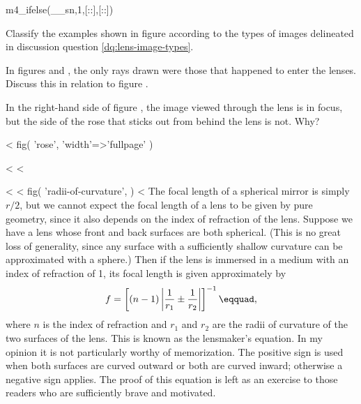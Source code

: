 m4_ifelse(__sn,1,[:\pagebreak:],[::])

\begin{dq}
Classify the examples shown in figure  according to
the types of images delineated in discussion question \ref{dq:lens-image-types}.
\end{dq}

\begin{dq}
In figures  and , the only rays drawn were those
that happened to enter the lenses. Discuss this in
relation to figure .
\end{dq}

\begin{dq}\label{dq:rose-image-focus}
In the right-hand side of figure , the image viewed
through the lens is in focus, but the side of the rose that
sticks out from behind the lens is not. Why?
\end{dq}

<%
  fig(
    'rose',
    {
      'width'=>'fullpage'
    }
  )

<%
<%

<%
<%
  fig(
    'radii-of-curvature',
  )
<%
The focal length of a spherical mirror is simply $r/2$, but
we cannot expect the focal length of a lens to be given by
pure geometry, since it also depends on the index of
refraction of the lens. Suppose we have a lens whose front
and back surfaces are both spherical. (This is no great loss
of generality, since any surface with a sufficiently shallow
curvature can be approximated with a sphere.) Then if the
lens is immersed in a medium with an index of refraction of
1, its focal length is given approximately by
\begin{equation*}
 f = \left[(n-1)\left|\frac{1}{r_1}\pm\frac{1}{r_2}\right|\right]^{-1}\eqquad,
\end{equation*}
where $n$ is the index of refraction and $r_1$ and $r_2$ are
the radii of curvature of the two surfaces of the lens. This
is known as the lensmaker's equation. In my opinion it is
not particularly worthy of memorization. The positive sign
is used when both surfaces are curved outward or both are
curved inward; otherwise a negative sign applies. The proof
of this equation is left as an exercise to those readers who
are sufficiently brave and motivated.

